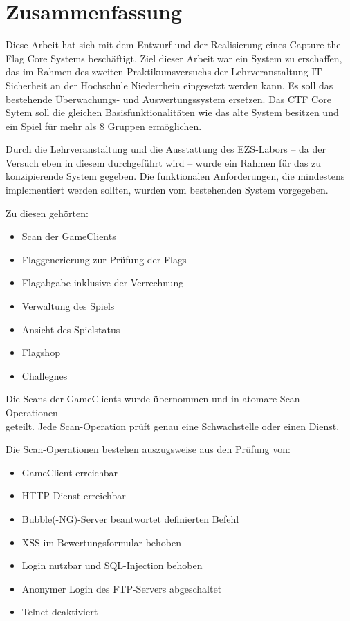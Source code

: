 \section{Zusammenfassung}
Diese Arbeit hat sich mit dem Entwurf und der Realisierung eines Capture the Flag Core Systems beschäftigt. Ziel dieser Arbeit war ein System zu erschaffen, das im Rahmen des zweiten Praktikumsversuchs der Lehrveranstaltung IT-Sicherheit an der Hochschule Niederrhein eingesetzt werden kann. Es soll das bestehende Überwachungs- und Auswertungssystem ersetzen. Das CTF Core Sytem soll die gleichen Basisfunktionalitäten wie das alte System besitzen und ein Spiel für mehr als 8 Gruppen ermöglichen.

Durch die Lehrveranstaltung und die Ausstattung des EZS-Labors -- da der Versuch eben in diesem durchgeführt wird -- wurde ein Rahmen für das zu konzipierende System gegeben.
Die funktionalen Anforderungen, die mindestens implementiert werden sollten, wurden vom bestehenden System vorgegeben.

Zu diesen gehörten:
\begin{itemize}
	\item Scan der GameClients
	\item Flaggenerierung zur Prüfung der Flags
	\item Flagabgabe inklusive der Verrechnung
	\item Verwaltung des Spiels
	\item Ansicht des Spielstatus
	\item Flagshop
	\item Challegnes
\end{itemize}

Die Scans der GameClients wurde übernommen und in atomare Scan-Operationen \\ geteilt. Jede Scan-Operation prüft genau eine Schwachstelle oder einen Dienst.

Die Scan-Operationen bestehen auszugsweise aus den Prüfung von:
\begin{itemize}
	\item GameClient erreichbar
	\item HTTP-Dienst erreichbar
	\item Bubble(-NG)-Server beantwortet definierten Befehl
	\item XSS im Bewertungsformular behoben
	\item Login nutzbar und SQL-Injection behoben
	\item Anonymer Login des FTP-Servers abgeschaltet
	\item Telnet deaktiviert
\end{itemize}

